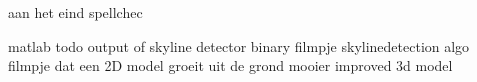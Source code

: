 



aan het eind
	spellchec

matlab todo
	output of skyline detector binary
	filmpje skylinedetection algo
	filmpje dat een 2D model groeit uit de grond
	mooier improved 3d model

